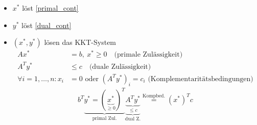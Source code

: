 \begin{itemize}
\begin{itemize}
			\item $x^*$ löst \eqref{primal_cont} 
			\item $y^*$ löst \eqref{dual_cont}
			\item $(x^*,y^*)$ lösen das KKT-System 
				\begin{align*}
					Ax^* &= b , \ x^* \geq 0 \quad \text{(primale Zulässigkeit)}\\
					A^{T} y^* &\leq c\quad \text{(duale Zulässigkeit)}\\
					\forall i = 1,\dots , n: x_{i}&= 0 \text{ oder } \left(A^{T}y^*  \right)_{i} = c_{i} \text{ (Komplementaritätsbedingungen)}
				\end{align*} 
				\begin{equation*}
					b^{T}\underbrace{y^* = (\underbrace{x^*}_{\geq 0})^{T}}_{\text{primal Zul.}} \underbrace{\underbrace{A^{T} y^*}_{\leq c }}_{\text{dual Z.}} \stackrel{\text{Kompbed.}}= \left(x^*\right)^{T} c
				\end{equation*} 
		\end{itemize} 
		

\end{itemize}
